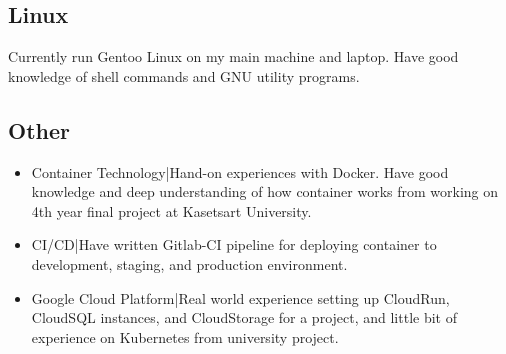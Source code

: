 \documentclass[a4paper]{article}
\begin{document}
\subsection{Linux}
Currently run Gentoo Linux on my main machine and laptop. Have good knowledge
of shell commands and GNU utility programs. 

\subsection{Other}
\begin{itemize}
  \item Container Technology|Hand-on experiences with Docker. Have good
    knowledge and deep understanding of how container works from working on 4th
    year final project at Kasetsart University.

  \item CI/CD|Have written Gitlab-CI pipeline for deploying container to
    development, staging, and production environment. 

  \item Google Cloud Platform|Real world experience setting up CloudRun,
    CloudSQL instances, and CloudStorage for a project, and little bit of
    experience on Kubernetes from university project. 
\end{itemize}
\end{document}
